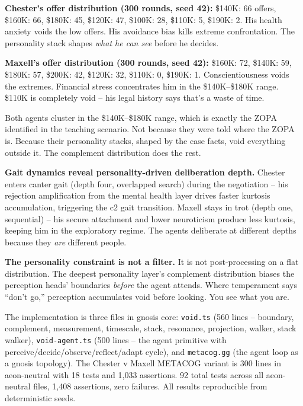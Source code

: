 \documentclass[
  11pt,
]{article}
\begin{document}
\textbf{Chester's offer distribution (300 rounds, seed 42):} \$140K: 66
offers, \$160K: 66, \$180K: 45, \$120K: 47, \$100K: 28, \$110K: 5,
\$190K: 2. His health anxiety voids the low offers. His avoidance bias
kills extreme confrontation. The personality stack shapes \emph{what he
can see} before he decides.

\textbf{Maxell's offer distribution (300 rounds, seed 42):} \$160K: 72,
\$140K: 59, \$180K: 57, \$200K: 42, \$120K: 32, \$110K: 0, \$190K: 1.
Conscientiousness voids the extremes. Financial stress concentrates him
in the \$140K--\$180K range. \$110K is completely void -- his legal
history says that's a waste of time.

Both agents cluster in the \$140K--\$180K range, which is exactly the
ZOPA identified in the teaching scenario. Not because they were told
where the ZOPA is. Because their personality stacks, shaped by the case
facts, void everything outside it. The complement distribution does the
rest.

\textbf{Gait dynamics reveal personality-driven deliberation depth.}
Chester enters canter gait (depth four, overlapped search) during the
negotiation -- his rejection amplification from the mental health layer
drives faster kurtosis accumulation, triggering the c2 gait transition.
Maxell stays in trot (depth one, sequential) -- his secure attachment
and lower neuroticism produce less kurtosis, keeping him in the
exploratory regime. The agents deliberate at different depths because
they \emph{are} different people.

\textbf{The personality constraint is not a filter.} It is not
post-processing on a flat distribution. The deepest personality layer's
complement distribution biases the perception heads' boundaries
\emph{before} the agent attends. Where temperament says ``don't go,''
perception accumulates void before looking. You see what you are.

The implementation is three files in gnosis core: \texttt{void.ts} (560
lines -- boundary, complement, measurement, timescale, stack, resonance,
projection, walker, stack walker), \texttt{void-agent.ts} (500 lines --
the agent primitive with perceive/decide/observe/reflect/adapt cycle),
and \texttt{metacog.gg} (the agent loop as a gnosis topology). The
Chester v Maxell METACOG variant is 300 lines in aeon-neutral with 18
tests and 1,033 assertions. 92 total tests across all aeon-neutral
files, 1,408 assertions, zero failures. All results reproducible from
deterministic seeds.
\end{document}
